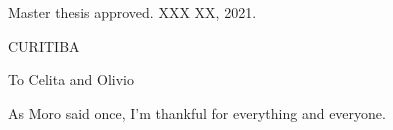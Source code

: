 \documentclass[12pt, %
               openright, %
               oneside, %
               a4paper, %
               chapter=TITLE, %
               section=TITLE, %
               brazil,
               english %
]{abntex2}
\begin{document}
%   
%   
\begin{folhadeaprovacao}
 \begin{center}
   {\ABNTEXchapterfont\large\imprimirautor}

   \vspace*{\fill}\vspace*{\fill}
   \begin{center}
     \ABNTEXchapterfont\bfseries\large\imprimirtitulo
   \end{center}
   \vspace*{\fill}

    \hspace{.45\textwidth}
    \begin{minipage}{.5\textwidth}
       \imprimirpreambulo
    \end{minipage}
   \vspace*{\fill}
 \end{center}

 Master thesis approved. XXX XX, 2021.


  \begin{center}
   \vspace*{0.5cm}
   {\large CURITIBA}
   \par
   {\large\imprimirdata}
   \vspace*{1cm}
 \end{center}

\end{folhadeaprovacao}
\begin{dedicatoria}
  \vspace*{22.7cm}
  \begin{flushright}
    \begin{minipage}[H]{4.5cm}
      {To Celita and Olivio}
    \end{minipage}
  \end{flushright}
\end{dedicatoria}
\begin{agradecimentos}
  As Moro said once, I'm thankful for everything and everyone.
\end{agradecimentos}
\end{document}
